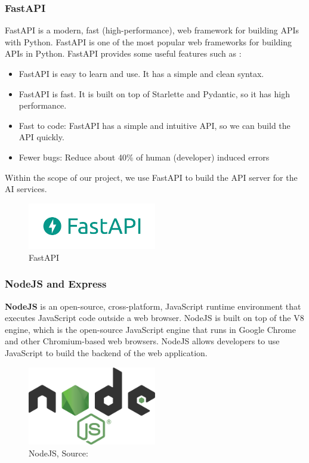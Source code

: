 \subsubsection{FastAPI}
FastAPI is a modern, fast (high-performance), web framework for building APIs with Python. FastAPI is one of the most popular web frameworks for building APIs in Python. FastAPI provides some useful features such as \cite{fastapi}:
\begin{itemize}
    \item FastAPI is easy to learn and use. It has a simple and clean syntax.
    \item FastAPI is fast. It is built on top of Starlette and Pydantic, so it has high performance.
    \item Fast to code: FastAPI has a simple and intuitive API, so we can build the API quickly.
    \item Fewer bugs: Reduce about 40\% of human (developer) induced errors
\end{itemize} 

\noindent Within the scope of our project, we use FastAPI to build the API server for the AI services. 

\begin{figure}[ht]
    \centering
    \includegraphics[width=0.5\textwidth]{../Images/8.Technology_Stack/fastapi_logo.png}
    \caption{FastAPI}
    \label{fig:fastapi}
\end{figure}

\subsubsection{NodeJS and Express}
\textbf{NodeJS} is an open-source, cross-platform, JavaScript runtime environment that executes JavaScript code outside a web browser. NodeJS is built on top of the V8 engine, which is the open-source JavaScript engine that runs in Google Chrome and other Chromium-based web browsers. NodeJS allows developers to use JavaScript to build the backend of the web application.
\begin{figure}[ht]
    \centering
    \includegraphics[width=0.5\textwidth]{../Images/8.Technology_Stack/nodejs_logo.png}
    \caption{NodeJS, Source: \cite{nodejs}}
    \label{fig:nodejs}
\end{figure}

